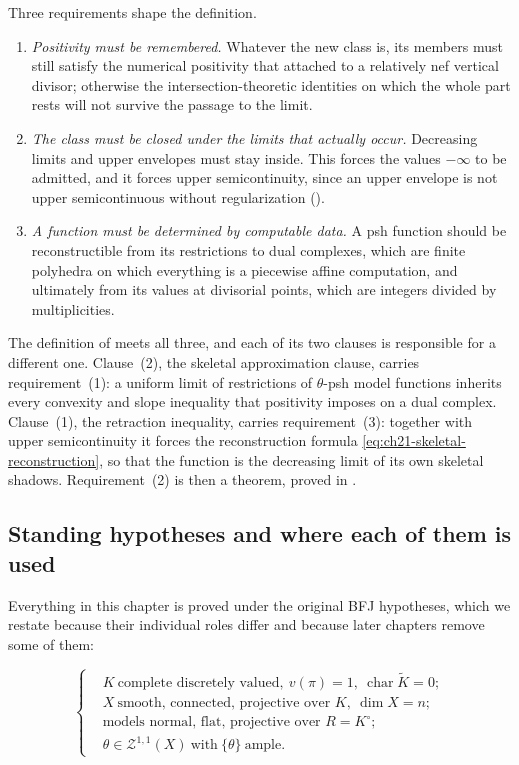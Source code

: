 Three requirements shape the definition.

\begin{enumerate}
\item \emph{Positivity must be remembered.}  Whatever the new class is, its
members must still satisfy the numerical positivity that
 attached to a relatively nef vertical divisor;
otherwise the intersection-theoretic identities on which the whole part
rests will not survive the passage to the limit.
\item \emph{The class must be closed under the limits that actually
occur.}  Decreasing limits and upper envelopes must stay inside.  This
forces the values \(-\infty\) to be admitted, and it forces upper
semicontinuity, since an upper envelope is not upper semicontinuous without
regularization ().
\item \emph{A function must be determined by computable data.}  A psh
function should be reconstructible from its restrictions to dual complexes,
which are finite polyhedra on which everything is a piecewise affine
computation, and ultimately from its values at divisorial points, which are
integers divided by multiplicities.
\end{enumerate}

The definition of  meets all three, and each of
its two clauses is responsible for a different one.  Clause~(2), the
skeletal approximation clause, carries requirement~(1): a uniform limit of
restrictions of \(\theta\)-psh model functions inherits every convexity and
slope inequality that positivity imposes on a dual complex.  Clause~(1), the
retraction inequality, carries requirement~(3): together with upper
semicontinuity it forces the reconstruction formula
\eqref{eq:ch21-skeletal-reconstruction}, so that the function is the
decreasing limit of its own skeletal shadows.  Requirement~(2) is then a
theorem, proved in .

\subsection{Standing hypotheses and where each of them is used}
\label{sec:ch21-hypotheses}

Everything in this chapter is proved under the original BFJ hypotheses,
which we restate because their individual roles differ and because later
chapters remove some of them:

\begin{equation}
\label{eq:ch21-hypotheses}
\left\{
\begin{aligned}
 &K\ \text{complete discretely valued},\ v(\pi)=1,\
   \operatorname{char}\widetilde K=0;\\
 &X\ \text{smooth, connected, projective over }K,\ \dim X=n;\\
 &\text{models normal, flat, projective over }R=K^\circ;\\
 &\theta\in\mathcal Z^{1,1}(X)\ \text{with}\ \{\theta\}\ \text{ample}.
\end{aligned}
\right.
\end{equation}

